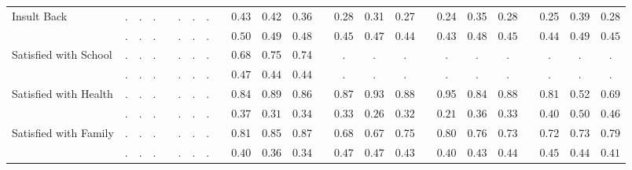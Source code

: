 \begin{center}
{\begin{longtable}{L{12em} c c c p{1.2em} c c c p{1.2em} c c c p{1.2em} c c c p{1.2em} c c c p{1.2em} c c c}
Insult Back & . &         . &         . & &         . &         . &         . & &      0.43 &      0.42 &      0.36 & &      0.28 &      0.31 &      0.27 & &      0.24 &      0.35 &      0.28 & &      0.25 &      0.39 &      0.28 \\*
& $\mathit{        .}$ & $\mathit{        .}$ & $\mathit{        .}$ & & $\mathit{        .}$ & $\mathit{        .}$ & $\mathit{        .}$ & & $\mathit{     0.50}$ & $\mathit{     0.49}$ & $\mathit{     0.48}$ & & $\mathit{     0.45}$ & $\mathit{     0.47}$ & $\mathit{     0.44}$ & & $\mathit{     0.43}$ & $\mathit{     0.48}$ & $\mathit{     0.45}$ & & $\mathit{     0.44}$ & $\mathit{     0.49}$ & $\mathit{     0.45}$ \\[.7em]
Satisfied with School & . &         . &         . & &         . &         . &         . & &      0.68 &      0.75 &      0.74 & &         . &         . &         . & &         . &         . &         . & &         . &         . &         . \\*
& $\mathit{        .}$ & $\mathit{        .}$ & $\mathit{        .}$ & & $\mathit{        .}$ & $\mathit{        .}$ & $\mathit{        .}$ & & $\mathit{     0.47}$ & $\mathit{     0.44}$ & $\mathit{     0.44}$ & & $\mathit{        .}$ & $\mathit{        .}$ & $\mathit{        .}$ & & $\mathit{        .}$ & $\mathit{        .}$ & $\mathit{        .}$ & & $\mathit{        .}$ & $\mathit{        .}$ & $\mathit{        .}$ \\[.7em]
Satisfied with Health & . &         . &         . & &         . &         . &         . & &      0.84 &      0.89 &      0.86 & &      0.87 &      0.93 &      0.88 & &      0.95 &      0.84 &      0.88 & &      0.81 &      0.52 &      0.69 \\*
& $\mathit{        .}$ & $\mathit{        .}$ & $\mathit{        .}$ & & $\mathit{        .}$ & $\mathit{        .}$ & $\mathit{        .}$ & & $\mathit{     0.37}$ & $\mathit{     0.31}$ & $\mathit{     0.34}$ & & $\mathit{     0.33}$ & $\mathit{     0.26}$ & $\mathit{     0.32}$ & & $\mathit{     0.21}$ & $\mathit{     0.36}$ & $\mathit{     0.33}$ & & $\mathit{     0.40}$ & $\mathit{     0.50}$ & $\mathit{     0.46}$ \\[.7em]
Satisfied with Family & . &         . &         . & &         . &         . &         . & &      0.81 &      0.85 &      0.87 & &      0.68 &      0.67 &      0.75 & &      0.80 &      0.76 &      0.73 & &      0.72 &      0.73 &      0.79 \\*
& $\mathit{        .}$ & $\mathit{        .}$ & $\mathit{        .}$ & & $\mathit{        .}$ & $\mathit{        .}$ & $\mathit{        .}$ & & $\mathit{     0.40}$ & $\mathit{     0.36}$ & $\mathit{     0.34}$ & & $\mathit{     0.47}$ & $\mathit{     0.47}$ & $\mathit{     0.43}$ & & $\mathit{     0.40}$ & $\mathit{     0.43}$ & $\mathit{     0.44}$ & & $\mathit{     0.45}$ & $\mathit{     0.44}$ & $\mathit{     0.41}$ \\[.7em]

\end{longtable}}
\end{center}
